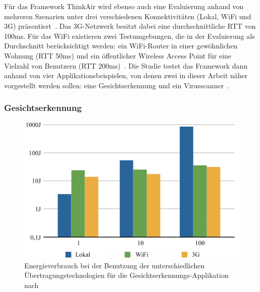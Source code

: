 \documentclass{sigchi}
\begin{document}
Für das Framework ThinkAir wird ebenso auch eine Evaluierung anhand von mehreren Szenarien unter drei verschiedenen Konnektivitäten (Lokal, WiFi und 3G) präsentiert~\cite{thinkair}.
Das 3G-Netzwerk besitzt dabei eine durchschnittliche RTT von 100ms.
Für das WiFi existieren zwei Testumgebungen, die in der Evaluierung als Durchschnitt berücksichtigt werden: ein WiFi-Router in einer gewöhnlichen Wohnung (RTT 50ms) und ein öffentlicher Wireless Access Point für eine Vielzahl von Benutzern (RTT 200ms)~\cite{thinkair}.
Die Studie testet das Framework dann anhand von vier Applikationsbeispielen, von denen zwei in dieser Arbeit näher vorgestellt werden sollen: eine Gesichtserkennung und ein Virusscanner~\cite{thinkair}.

\subsubsection{Gesichtserkennung}

\begin{figure}
\centering
  \includegraphics[width=1.0\columnwidth]{images/thinkair}
  \caption{Energieverbrauch bei der Benutzung der unterschiedlichen Über\-tra\-gungs\-tech\-no\-lo\-gien für die Gesichtserkennungs-Applikation nach~\protect\cite{thinkair}}\label{fig:thinkair}
\end{figure}
\end{document}
